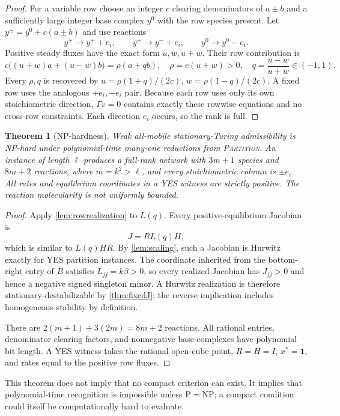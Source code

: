 \documentclass[11pt]{article}
\newtheorem{theorem}{Theorem}[section]
\theoremstyle{definition}
\begin{document}
\begin{proof}
For a variable row choose an integer $c$ clearing denominators of $a\pm b$ and
a sufficiently large integer base complex $y^0$ with the row species present.
Let $y^\pm=y^0+c(a\pm b)$ and use reactions
\[
 y^+\to y^++e_i,
 \qquad y^-\to y^-+e_i,
 \qquad y^0\to y^0-e_i.
\]
Positive steady fluxes have the exact form $u,w,u+w$.  Their row contribution
is
\[
 c\bigl((u+w)a+(u-w)b\bigr)=\rho(a+qb),
\quad
\rho=c(u+w)>0,
\quad
q=\frac{u-w}{u+w}\in(-1,1).
\]
Every $\rho,q$ is recovered by
$u=\rho(1+q)/(2c)$, $w=\rho(1-q)/(2c)$.  A fixed row uses the analogous
$+e_i,-e_i$ pair.  Because each row uses only its own stoichiometric direction,
$\Gamma v=0$ contains exactly these rowwise equations and no cross-row
constraints.  Each direction $e_i$ occurs, so the rank is full.
\end{proof}

\begin{theorem}[NP-hardness]
\label{thm:nphard}
Weak all-mobile stationary-Turing admissibility is NP-hard under
polynomial-time many-one reductions from \textsc{Partition}.  An instance of
length $\ell$ produces a full-rank network with $3m+1$ species and $8m+2$
reactions, where $m=k^2>\ell$, and every stoichiometric column is $\pm e_i$.
All rates and equilibrium coordinates in a YES witness are strictly positive.
The reaction molecularity is not uniformly bounded.
\end{theorem}

\begin{proof}
Apply \cref{lem:rowrealization} to $L(q)$.  Every positive-equilibrium Jacobian
is
\[
 J=R L(q)H,
\]
which is similar to $L(q)HR$.  By \cref{lem:scaling}, such a Jacobian is
Hurwitz exactly for YES partition instances.  The coordinate inherited from
the bottom-right entry of $B$ satisfies $L_{jj}=k\beta>0$, so every realized
Jacobian has $J_{jj}>0$ and hence a negative signed singleton minor.  A Hurwitz
realization is therefore stationary-destabilizable by \cref{thm:fixedJ}; the
reverse implication includes homogeneous stability by definition.

There are $2(m+1)+3(2m)=8m+2$ reactions.  All rational entries, denominator
clearing factors, and nonnegative base complexes have polynomial bit length.
A YES witness takes the rational open-cube point, $R=H=I$, $x^*=\mathbf1$, and
rates equal to the positive row fluxes.
\end{proof}

This theorem does not imply that no compact criterion can exist.  It implies
that polynomial-time recognition is impossible unless $\mathrm P=\mathrm{NP}$;
a compact condition could itself be computationally hard to evaluate.
\end{document}
